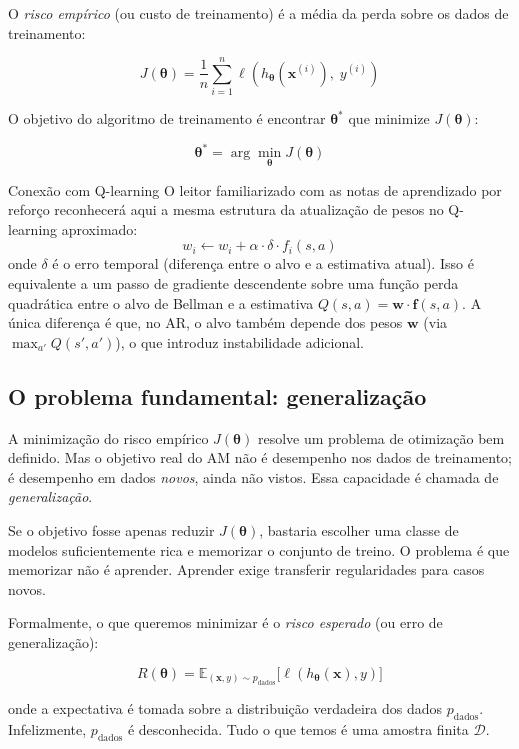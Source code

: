 \documentclass[12pt,a4paper]{article}
\begin{document}
O \emph{risco empírico} (ou custo de treinamento) é a média da perda sobre os dados de treinamento:

\[
J(\boldsymbol{\theta}) = \frac{1}{n} \sum_{i=1}^{n} \ell\!\left(h_{\boldsymbol{\theta}}(\mathbf{x}^{(i)}),\; y^{(i)}\right)
\]

O objetivo do algoritmo de treinamento é encontrar $\boldsymbol{\theta}^*$ que minimize $J(\boldsymbol{\theta})$:

\[
\boldsymbol{\theta}^* = \arg\min_{\boldsymbol{\theta}} J(\boldsymbol{\theta})
\]

\begin{notabox}{Conexão com Q-learning}
O leitor familiarizado com as notas de aprendizado por reforço reconhecerá aqui a mesma estrutura da atualização de pesos no Q-learning aproximado:
\[
w_i \leftarrow w_i + \alpha \cdot \delta \cdot f_i(s,a)
\]
onde $\delta$ é o erro temporal (diferença entre o alvo e a estimativa atual). Isso é equivalente a um passo de gradiente descendente sobre uma função perda quadrática entre o alvo de Bellman e a estimativa $Q(s,a) = \mathbf{w} \cdot \mathbf{f}(s,a)$. A única diferença é que, no AR, o alvo também depende dos pesos $\mathbf{w}$ (via $\max_{a'} Q(s',a')$), o que introduz instabilidade adicional.
\end{notabox}

\subsection{O problema fundamental: generalização}
\label{subsec:generalizacao}

A minimização do risco empírico $J(\boldsymbol{\theta})$ resolve um problema de otimização bem definido. Mas o objetivo real do AM não é desempenho nos dados de treinamento; é desempenho em dados \emph{novos}, ainda não vistos. Essa capacidade é chamada de \emph{generalização}.

Se o objetivo fosse apenas reduzir $J(\boldsymbol{\theta})$, bastaria escolher uma classe de modelos suficientemente rica e memorizar o conjunto de treino. O problema é que memorizar não é aprender. Aprender exige transferir regularidades para casos novos.

Formalmente, o que queremos minimizar é o \emph{risco esperado} (ou erro de generalização):

\[
R(\boldsymbol{\theta}) = \mathbb{E}_{(\mathbf{x}, y) \sim p_{\text{dados}}}\bigl[\ell(h_{\boldsymbol{\theta}}(\mathbf{x}), y)\bigr]
\]

onde a expectativa é tomada sobre a distribuição verdadeira dos dados $p_{\text{dados}}$. Infelizmente, $p_{\text{dados}}$ é desconhecida. Tudo o que temos é uma amostra finita $\mathcal{D}$.
\end{document}
